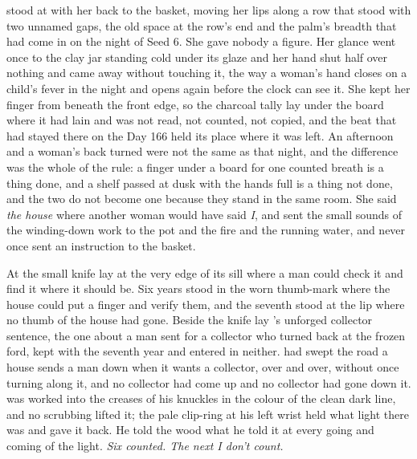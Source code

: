  stood at  with her back to the basket, moving her lips along a row that stood with two unnamed gaps, the old space at the row's end and the palm's breadth that had come in on the night of Seed 6. She gave nobody a figure. Her glance went once to the clay jar standing cold under its glaze and her hand shut half over nothing and came away without touching it, the way a woman's hand closes on a child's fever in the night and opens again before the clock can see it. She kept her finger from beneath the front edge, so the charcoal tally lay under the board where it had lain and was not read, not counted, not copied, and the beat that had stayed there on the Day 166 held its place where it was left. An afternoon and a woman's back turned were not the same as that night, and the difference was the whole of the rule: a finger under a board for one counted breath is a thing done, and a shelf passed at dusk with the hands full is a thing not done, and the two do not become one because they stand in the same room. She said \emph{the house} where another woman would have said \emph{I}, and sent the small sounds of the winding-down work to the pot and the fire and the running water, and never once sent an instruction to the basket.

At  the small knife lay at the very edge of its sill where a man could check it and find it where it should be. Six years stood in the worn thumb-mark where the house could put a finger and verify them, and the seventh stood at the lip where no thumb of the house had gone. Beside the knife lay 's unforged collector sentence, the one about a man sent for a collector who turned back at the frozen ford, kept with the seventh year and entered in neither.  had swept the road a house sends a man down when it wants a collector, over and over, without once turning along it, and no collector had come up  and no collector had gone down it.  was worked into the creases of his knuckles in the colour of the clean dark line, and no scrubbing lifted it; the pale clip-ring at his left wrist held what light there was and gave it back. He told the wood what he told it at every going and coming of the light. \emph{Six counted. The next I don't count.}

